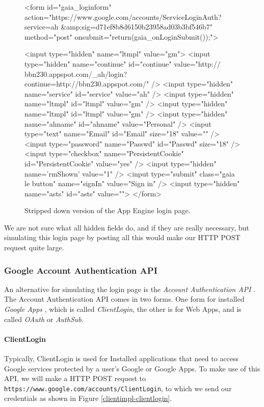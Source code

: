 \begin{figure}[ht] %
\begin{center}
\begin{code}
<form id="gaia_loginform" 
action="https://www.google.com/accounts/ServiceLoginAuth?service=ah
    &amp;sig=d71ef8b8d6150b23958ad03b3bf546b7" 
  method="post"
  onsubmit="return(gaia_onLoginSubmit());">

<input type="hidden" name="ltmpl" value="gm">
<input type="hidden" name="continue" id="continue"
  value="http:// bbn230.appspot.com/_ah/login?
  continue=http://bbn230.appspot.com/" />
<input type="hidden" name="service" id="service" value="ah" />
<input type="hidden" name="ltmpl" id="ltmpl" value="gm" />
<input type="hidden" name="ltmpl" id="ltmpl" value="gm" />
<input type="hidden" name="ahname" id="ahname" value="Personal" />
<input type="text" name="Email"  id="Email" size="18" value="" />
<input type="password" name="Passwd" id="Passwd" size="18" />
<input type="checkbox" name="PersistentCookie" id="PersistentCookie" 
  value="yes" />
<input type="hidden" name='rmShown' value="1" />
<input type="submit" class="gaia le button" name="signIn" value="Sign in" />
<input type="hidden" name="asts" id="asts" value="">
</form>
\end{code}
\caption{Stripped down version of the App Engine
login page.\label{clientimpl-loginform}}
\end{center}
\end{figure}

We are not sure what all hidden fields do, and if they are really necessary, but
simulating this login page by posting all this would make our HTTP POST request
quite large.

\subsubsection{Google Account Authentication API}
An alternative for simulating the login page is the \emph{Account
Authentication API} \cite{account-auth-api}. The Account Authentication API
comes in two forms. One form for installed \emph{Google Apps}
\cite{google-apps-www}, which is called \emph{ClientLogin}, the other is for Web
Apps, and is called \emph{OAuth} or \emph{AuthSub}.

\paragraph{ClientLogin}
Typically, ClientLogin is used for Installed applications that need to access
Google services protected by a user's Google or Google Apps. To make use of this
API, we will make a HTTP POST request to
\texttt{https://www.google.com/accounts/ClientLogin}, to which we send our
credentials as shown in Figure \ref{clientimpl-clientlogin}.

